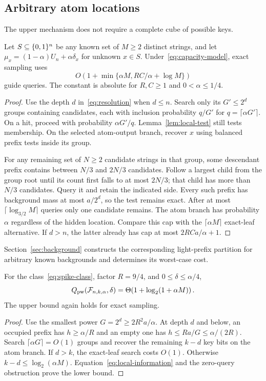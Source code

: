 \subsection{Arbitrary atom locations}
The upper mechanism does not require a complete cube of possible keys.
\begin{proposition}\label{prop:arbitrary-locations}
Let $S\subseteq\{0,1\}^n$ be any known set of $M\ge2$ distinct strings, and let $\mu_x=(1-\alpha)U_n+\alpha\delta_x$ for unknown $x\in S$. Under~\eqref{eq:capacity-model}, exact sampling uses
\begin{equation}\label{eq:arbitrary-upper}
 O\!\left(1+\min\{\alpha M,RC/\alpha+\log M\}\right)
\end{equation}
guide queries. The constant is absolute for $R,C\ge1$ and $0<\alpha\le1/4$.
\end{proposition}
\begin{proof}
Use the depth $d$ in~\eqref{eq:resolution} when $d\le n$. Search only its $G'\le2^d$ groups containing candidates, each with inclusion probability $q/G'$ for $q=\lceil\alpha G'\rceil$. On a hit, proceed with probability $\alpha G'/q$. Lemma~\ref{lem:local-test} still tests membership. On the selected atom-output branch, recover $x$ using balanced prefix tests inside its group.

For any remaining set of $N\ge2$ candidate strings in that group, some descendant prefix contains between $N/3$ and $2N/3$ candidates. Follow a largest child from the group root until its count first falls to at most $2N/3$; that child has more than $N/3$ candidates. Query it and retain the indicated side. Every such prefix has background mass at most $a/2^d$, so the test remains exact. After at most $\lceil\log_{3/2}M\rceil$ queries only one candidate remains. The atom branch has probability $\alpha$ regardless of the hidden location. Compare this cap with the $\lceil\alpha M\rceil$ exact-leaf alternative. If $d>n$, the latter already has cap at most $2RCa/\alpha+1$.
\end{proof}

Section~\ref{sec:background} constructs the corresponding light-prefix partition for arbitrary known backgrounds and determines its worst-case cost.

\begin{corollary}\label{cor:spike-pointwise}
For the class~\eqref{eq:spike-class}, factor $R=9/4$, and $0\le\delta\le\alpha/4$,
\[
 Q_{\mathrm{pw}}(\mathcal F_{n,k,\alpha},\delta)
 =\Theta\!\left(1+\log_2(1+\alpha M)\right).
\]
The upper bound again holds for exact sampling.
\end{corollary}
\begin{proof}
Use the smallest power $G=2^d\ge2R^2a/\alpha$. At depth $d$ and below, an occupied prefix has $h\ge\alpha/R$ and an empty one has $h\le Ra/G\le\alpha/(2R)$. Search $\lceil\alpha G\rceil=O(1)$ groups and recover the remaining $k-d$ key bits on the atom branch. If $d>k$, the exact-leaf search costs $O(1)$. Otherwise $k-d\le\log_2(\alpha M)$. Equation~\eqref{eq:local-information} and the zero-query obstruction prove the lower bound.
\end{proof}

